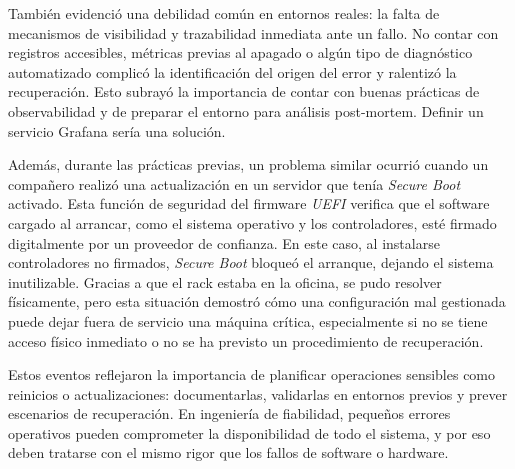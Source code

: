 También evidenció una debilidad común en entornos reales: la falta de mecanismos de visibilidad y trazabilidad inmediata ante un fallo. No contar con registros accesibles, métricas previas al apagado o algún tipo de diagnóstico automatizado complicó la identificación del origen del error y ralentizó la recuperación. Esto subrayó la importancia de contar con buenas prácticas de observabilidad y de preparar el entorno para análisis post-mortem. Definir un servicio Grafana sería una solución. 

Además, durante las prácticas previas, un problema similar ocurrió cuando un compañero realizó una actualización en un servidor que tenía \textit{Secure Boot} activado. Esta función de seguridad del firmware \textit{UEFI} verifica que el software cargado al arrancar, como el sistema operativo y los controladores, esté firmado digitalmente por un proveedor de confianza. En este caso, al instalarse controladores no firmados, \textit{Secure Boot} bloqueó el arranque, dejando el sistema inutilizable. Gracias a que el rack estaba en la oficina, se pudo resolver físicamente, pero esta situación demostró cómo una configuración mal gestionada puede dejar fuera de servicio una máquina crítica, especialmente si no se tiene acceso físico inmediato o no se ha previsto un procedimiento de recuperación.

Estos eventos reflejaron la importancia de planificar operaciones sensibles como reinicios o actualizaciones: documentarlas, validarlas en entornos previos y prever escenarios de recuperación. En ingeniería de fiabilidad, pequeños errores operativos pueden comprometer la disponibilidad de todo el sistema, y por eso deben tratarse con el mismo rigor que los fallos de software o hardware.

